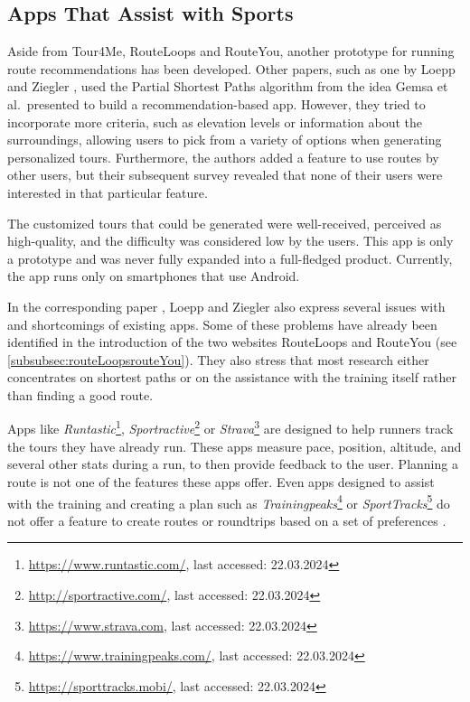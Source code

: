 \subsection{Apps That Assist with Sports}
\label{subsec:runningApps}

Aside from Tour4Me, RouteLoops and RouteYou, another prototype for running route recommendations has been developed.
Other papers, such as one by Loepp and Ziegler \cite{loepp_recommending_2018}, used the Partial Shortest Paths algorithm from the idea Gemsa et al.\ presented \cite{gemsa_efficient_2013} to build a recommendation-based app.
However, they tried to incorporate more criteria, such as elevation levels or information about the surroundings, allowing users to pick from a variety of options when generating personalized tours. 
Furthermore, the authors added a feature to use routes by other users, but their subsequent survey revealed that none of their users were interested in that particular feature.

The customized tours that could be generated were well-received, perceived as high-quality, and the difficulty was considered low by the users.
This app is only a prototype and was never fully expanded into a full-fledged product.
Currently, the app runs only on smartphones that use Android. 

In the corresponding paper \cite{loepp_recommending_2018}, Loepp and Ziegler also express several issues with and shortcomings of existing apps.
Some of these problems have already been identified in the introduction of the two websites RouteLoops and RouteYou (see \ref{subsubsec:routeLoopsrouteYou}).
They also stress that most research either concentrates on shortest paths or on the assistance with the training itself rather than finding a good route.

Apps like \textit{Runtastic}\footnote{\url{https://www.runtastic.com/}, last accessed: 22.03.2024}, \textit{Sportractive}\footnote{\url{http://sportractive.com/}, last accessed: 22.03.2024} or \textit{Strava}\footnote{\url{https://www.strava.com}, last accessed: 22.03.2024} are designed to help runners track the tours they have already run. 
These apps measure pace, position, altitude, and several other stats during a run, to then provide feedback to the user. 
Planning a route is not one of the features these apps offer.
Even apps designed to assist with the training and creating a plan such as \textit{Trainingpeaks}\footnote{\url{https://www.trainingpeaks.com/}, last accessed: 22.03.2024} or \textit{SportTracks}\footnote{\url{https://sporttracks.mobi/}, last accessed: 22.03.2024} do not offer a feature to create routes or roundtrips based on a set of preferences \cite{loepp_recommending_2018}.

